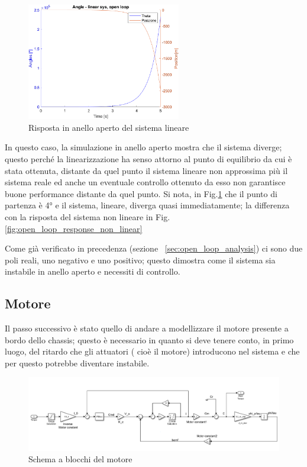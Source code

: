 \begin{figure}[H]
	\centering   	
	\includegraphics[width=0.6\textwidth]{Immagini/linear_open_loop.png}
	\caption{Risposta in anello aperto del sistema lineare}
	\label{fig:open_loop_response}
\end{figure}
In questo caso, la simulazione in anello aperto mostra che il sistema diverge; questo perché la linearizzazione ha senso attorno al punto di equilibrio da cui è stata ottenuta, distante da quel punto il sistema lineare non approssima più il sistema reale ed anche un eventuale controllo ottenuto da esso non garantisce buone performance distante da quel punto. Si nota, in Fig.\ref{fig:open_loop_response} che il punto di partenza è 4° e il sistema, lineare, diverga quasi immediatamente; la differenza con la risposta del sistema non lineare in Fig.\ref{fig:open_loop_response_non_linear}

Come già verificato in precedenza (sezione ~\ref{sec:open_loop_analysis}) ci sono due poli reali, uno negativo e uno positivo; questo dimostra come il sistema sia instabile in anello aperto e necessiti di controllo.

\subsection{Motore}
Il passo successivo è stato quello di andare a modellizzare il motore presente a bordo dello chassis; questo è necessario in quanto si deve tenere conto, in primo luogo, del ritardo che gli attuatori ( cioè il motore) introducono nel sistema e che per questo potrebbe diventare instabile.
\begin{figure}[H]
	\centering   	
	\includegraphics[width=1\textwidth]{Immagini/motor.png}
	\caption{Schema a blocchi del motore}
	\label{fig:motor}
\end{figure}

